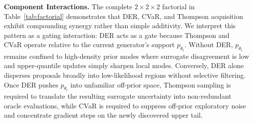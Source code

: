 \documentclass{article}
\begin{document}

\textbf{Component Interactions.} The complete $2 \times 2 \times 2$ factorial in Table~\ref{tab:factorial} demonstrates that DER, CVaR, and Thompson acquisition exhibit compounding synergy rather than simple additivity. We interpret this pattern as a gating interaction: DER acts as a gate because Thompson and CVaR operate relative to the current generator's support $p_{\theta_t}$. Without DER, $p_{\theta_t}$ remains confined to high-density prior modes where surrogate disagreement is low and upper-quantile updates simply sharpen local modes. Conversely, DER alone disperses proposals broadly into low-likelihood regions without selective filtering. Once DER pushes $p_{\theta_t}$ into unfamiliar off-prior space, Thompson sampling is required to translate the resulting surrogate uncertainty into non-redundant oracle evaluations, while CVaR is required to suppress off-prior exploratory noise and concentrate gradient steps on the newly discovered upper tail.
\end{document}
